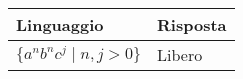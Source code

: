 \documentclass{standalone}
\begin{document}
	\begin{tabularx}{\textwidth}{XX}
		Linguaggio & Risposta \\
    \midrule
        $\{ a^n b^n c^j \mid n, j > 0 \}$
        &
				Libero
	\end{tabularx}
\end{document}
